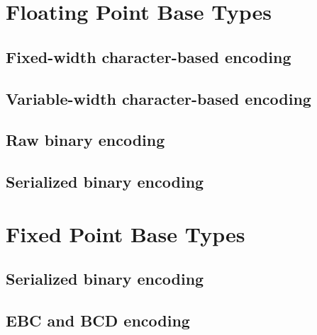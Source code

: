 \cBegin{}
\cEnd{}


\section{Floating Point Base Types}

\subsection{Fixed-width character-based encoding}

\aedBegin{}
\aedEnd{}



\subsection{Variable-width character-based encoding}

\aedBegin{}
\aedEnd{}


\subsection{Raw binary encoding}

\bBegin{}
\bEnd{}


\subsection{Serialized binary encoding}

\sbBegin{}
\sbEnd{}


\section{Fixed Point Base Types}

\subsection{Serialized binary encoding}

\sbBegin{}
\bEnd{}


\subsection{EBC and BCD encoding}

\cBegin{}
\cEnd{}

